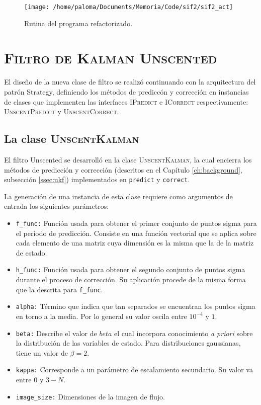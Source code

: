 \begin{figure}
\centering
\texttt{[image: /home/paloma/Documents/Memoria/Code/sif2/sif2\_act]}
\label{fig:new_routine}
\caption{Rutina del programa refactorizado.}
\end{figure}  


\section{\textsc{Filtro de Kalman Unscented}}
El dise\~no de la nueva clase de filtro se realiz\'o continuando con la arquitectura del patr\'on Strategy, definiendo los m\'etodos de predicc\'on y correcci\'on en instancias de clases que implementen las interfaces \textsc{IPredict} e \textsc{ICorrect} respectivamente: \textsc{UnscentPredict} y \textsc{UnscentCorrect}.

\subsection{La clase \textsc{UnscentKalman}}

El filtro Unscented se desarroll\'o en la clase \textsc{UnscentKalman}, la cual encierra los m\'etodos de predicci\'on y correcci\'on (descritos en el Cap\'itulo \ref{ch:background}, subsecci\'on \ref{ssec:ukf}) implementados en \texttt{predict} y \texttt{correct}.
\bigskip

La generaci\'on de una instancia de esta clase requiere como argumentos de entrada los siguientes par\'ametros:

\begin{itemize}
\item \texttt{f\_func:} Funci\'on usada para obtener el primer conjunto de puntos sigma para el periodo de predicci\'on. Consiste en una funci\'on vectorial que se aplica sobre cada elemento de una matriz cuya dimensi\'on es la misma que la de la matriz de estado.
\item \texttt{h\_func:} Funci\'on usada para obtener el segundo conjunto de puntos sigma durante el proceso de correcci\'on. Su aplicaci\'on procede de la misma forma que la descrita para \texttt{f\_func}. 
\item \texttt{alpha:} T\'ermino que indica que tan separados se encuentran los puntos sigma en torno a la media. Por lo general su valor oscila entre $10^{-4}$ y $1$. 
\item \texttt{beta:} Describe el valor de $beta$ el cual incorpora conocimiento \textit{a priori} sobre la distribuci\'on de las variables de estado. Para distribuciones gaussianas, tiene un valor de $\beta=2$. 
\item \texttt{kappa:} Corresponde a un par\'ametro de escalamiento secundario. Su valor va entre $0$ y $3-N$.
\item \texttt{image\_size:} Dimensiones de la imagen de flujo.
\end{itemize}

